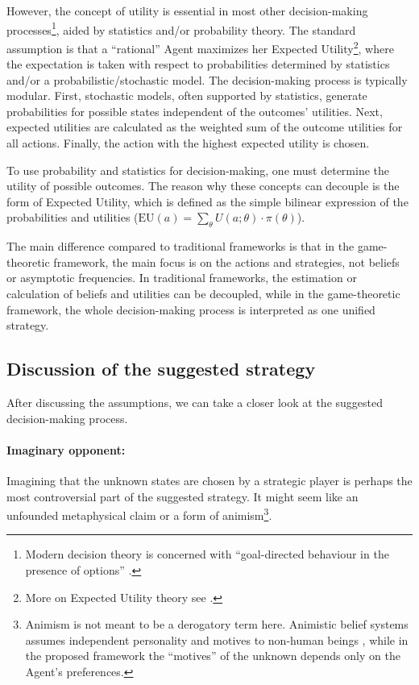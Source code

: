 \documentclass{article}
\begin{document}
However, the concept of utility is essential in most other decision-making processes\footnote{Modern decision theory is concerned with ``goal-directed behaviour in the presence of options'' \cite{paper:DecisionTheoryAnOverview}.}, aided by statistics and/or probability theory. The standard assumption is that a ``rational'' Agent maximizes her Expected Utility\footnote{More on Expected Utility theory see \cite{plato:ExpectedUtility}.}, where the expectation is taken with respect to probabilities determined by statistics and/or a probabilistic/stochastic model. 
The decision-making process is typically modular. First, stochastic models, often supported by statistics, generate probabilities for possible states independent of the outcomes' utilities. Next, expected utilities are calculated as the weighted sum of the outcome utilities for all actions. Finally, the action with the highest expected utility is chosen.


To use probability and statistics for decision-making, one must determine the utility of possible outcomes. The reason why these concepts can decouple is the form of Expected Utility, which is defined as the simple bilinear expression of the probabilities and utilities ($\mathrm{EU}(a)=\sum_\theta U(a;\theta) \cdot \pi(\theta)$).

The main difference compared to traditional frameworks is that in the game-theoretic framework, the main focus is on the actions and strategies, not beliefs or asymptotic frequencies.
In traditional frameworks, the estimation or calculation of beliefs and utilities can be decoupled, while in the game-theoretic framework, the whole decision-making process is interpreted as one unified strategy.

\subsection*{Discussion of the suggested strategy}

After discussing the assumptions, we can take a closer look at the suggested decision-making process.

\paragraph{Imaginary opponent:}
Imagining that the unknown states are chosen by a strategic player is perhaps the most controversial part of the suggested strategy. It might seem like an unfounded metaphysical claim or a form of animism\footnote{Animism is not meant to be a derogatory term here. Animistic belief systems assumes independent personality and motives to non-human beings \cite{book:Animism}, while in the proposed framework the ``motives'' of the unknown depends only on the Agent's preferences.}. 
\end{document}
